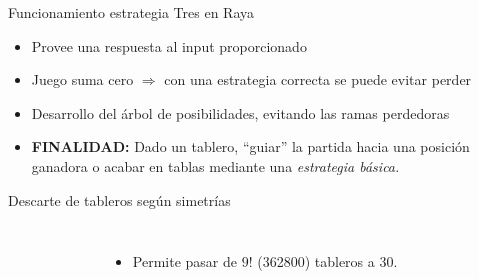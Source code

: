 \documentclass[xcolor = {dvipsnames, table}]{beamer}
\begin{document}
\begin{frame}{Funcionamiento estrategia Tres en Raya}
  \begin{itemize}
    \item Provee una respuesta al input proporcionado
    \item Juego suma cero $\Rightarrow$ con una estrategia correcta se puede evitar perder
    \item Desarrollo del árbol de posibilidades, evitando las ramas perdedoras
    \item \textbf{FINALIDAD:} Dado un tablero, ``guiar'' la partida hacia una
    posición ganadora o acabar en tablas mediante una \textit{estrategia
      básica.}
  \end{itemize}
\end{frame}

\begin{frame}{Descarte de tableros según simetrías}
  \begin{columns}
    \begin{figure}
      \centering
      \scalebox{.5}{}
    \end{figure}
    \begin{itemize}
      \item Permite pasar de $9!$ (362800) tableros a 30.
    \end{itemize}
  \end{columns}
\end{frame}
\end{document}

